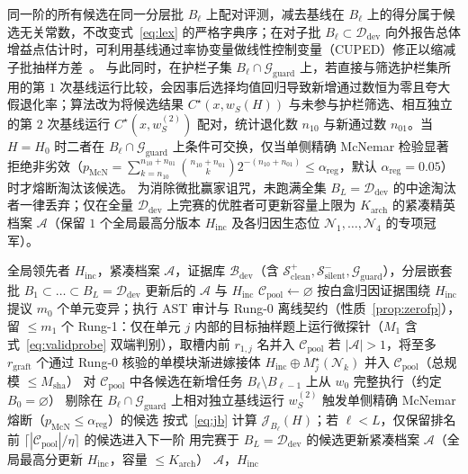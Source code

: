 \documentclass[UTF8,a4paper,10.5pt]{ctexart}
\newcommand{\Ddev}{\mathcal{D}_{\mathrm{dev}}}
\newcommand{\Sclean}{\mathcal{S}^+_{\mathrm{clean}}}
\newcommand{\Ssilent}{\mathcal{S}^-_{\mathrm{silent}}}
\begin{document}
同一阶的所有候选在同一分层批 $B_\ell$ 上配对评测，减去基线在 $B_\ell$ 上的得分属于候选无关常数，不改变式~\eqref{eq:lex} 的严格字典序；在对子批 $B_\ell\subset\Ddev$ 向外报告总体增益点估计时，可利用基线通过率协变量做线性控制变量（CUPED）修正以缩减子批抽样方差~\cite{cuped}。
与此同时，在护栏子集 $B_\ell\cap\mathcal{G}_{\mathrm{guard}}$ 上，若直接与筛选护栏集所用的第 $1$ 次基线运行比较，会因事后选择均值回归导致新增通过数恒为零且夸大假退化率；算法改为将候选结果 $C^\star(x,w_S(H))$ 与未参与护栏筛选、相互独立的第 $2$ 次基线运行 $C^\star(x,w^{(2)}_S)$ 配对，统计退化数 $n_{10}$ 与新通过数 $n_{01}$。当 $H=H_0$ 时二者在 $B_\ell\cap\mathcal{G}_{\mathrm{guard}}$ 上条件可交换，仅当单侧精确 McNemar 检验显著拒绝非劣效（$p_{\mathrm{McN}}=\sum_{k=n_{10}}^{n_{10}+n_{01}}\binom{n_{10}+n_{01}}{k}2^{-(n_{10}+n_{01})}\le\alpha_{\mathrm{reg}}$，默认 $\alpha_{\mathrm{reg}}=0.05$）时才熔断淘汰该候选。
为消除微批赢家诅咒，未跑满全集 $B_L=\Ddev$ 的中途淘汰者一律丢弃；仅在全量 $\Ddev$ 上完赛的优胜者可更新容量上限为 $K_{\mathrm{arch}}$ 的紧凑精英档案 $\mathcal{A}$（保留 $1$ 个全局最高分版本 $H_{\mathrm{inc}}$ 及各归因生态位 $\mathcal{N}_1,\dots,\mathcal{N}_4$ 的专项冠军）。

\begin{algorithm}[t]
\caption{单代四阶证伪与跨槽配对连续减半}
\label{alg:generation}
\begin{algorithmic}[1]
\Require 全局领先者 $H_{\mathrm{inc}}$，紧凑档案 $\mathcal{A}$，证据库 $\mathcal{B}_{\mathrm{dev}}$（含 $\Sclean,\Ssilent,\mathcal{G}_{\mathrm{guard}}$），分层嵌套批 $B_1\subset\dots\subset B_L=\Ddev$
\Ensure 更新后的 $\mathcal{A}$ 与 $H_{\mathrm{inc}}$
\State $\mathcal{C}_{\mathrm{pool}}\gets\varnothing$
  \State 按白盒归因证据围绕 $H_{\mathrm{inc}}$ 提议 $m_0$ 个单元变异；执行 AST 审计与 Rung-0 离线契约（性质~\ref{prop:zerofp}），留 $\le m_1$ 个
  \State Rung-1：仅在单元 $j$ 内部的目标抽样题上运行微探针（$M_1$ 含式~\eqref{eq:validprobe} 双端判别），取槽内前 $r_{1,j}$ 名并入 $\mathcal{C}_{\mathrm{pool}}$
\EndFor
\State 若 $|\mathcal{A}|>1$，将至多 $r_{\mathrm{graft}}$ 个通过 Rung-0 核验的单模块渐进嫁接体 $H_{\mathrm{inc}}\oplus M_j^\star(\mathcal{N}_k)$ 并入 $\mathcal{C}_{\mathrm{pool}}$（总规模 $\le M_{\mathrm{sha}}$）
  \State 对 $\mathcal{C}_{\mathrm{pool}}$ 中各候选在新增任务 $B_\ell\setminus B_{\ell-1}$ 上从 $w_0$ 完整执行（约定 $B_0=\varnothing$）
  \State 剔除在 $B_\ell\cap\mathcal{G}_{\mathrm{guard}}$ 上相对独立基线运行 $w^{(2)}_S$ 触发单侧精确 McNemar 熔断（$p_{\mathrm{McN}}\le\alpha_{\mathrm{reg}}$）的候选
  \State 按式~\eqref{eq:jb} 计算 $\mathcal{J}_{B_\ell}(H)$；若 $\ell<L$，仅保留排名前 $\lceil |\mathcal{C}_{\mathrm{pool}}|/\eta\rceil$ 的候选进入下一阶
\EndFor
\State 用完赛于 $B_L=\Ddev$ 的候选更新紧凑档案 $\mathcal{A}$（全局最高分更新 $H_{\mathrm{inc}}$，容量 $\le K_{\mathrm{arch}}$）
\State \Return $\mathcal{A}$，$H_{\mathrm{inc}}$
\end{algorithmic}
\end{algorithm}
\end{document}
